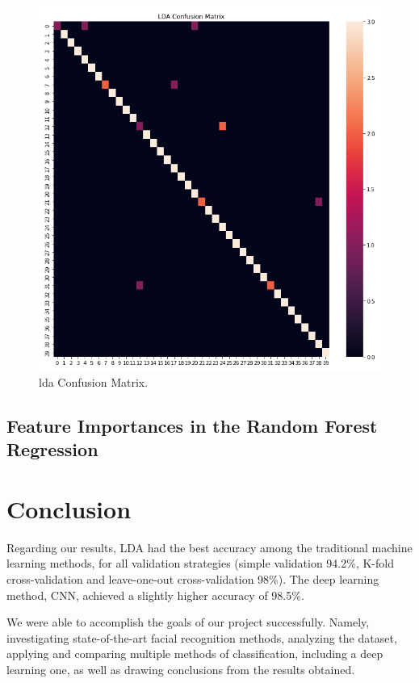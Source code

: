 \documentclass[conference]{IEEEtran}
\begin{document}
\begin{figure}[]
    \centering
    \includegraphics[scale=0.5]{images/8_lda_confusion_matrix.png}
    \caption{\gls{lda} Confusion Matrix.}
    \label{fig:lda_confusion_matrix}
\end{figure}

\subsection{Feature Importances in the Random Forest Regression}

\section{Conclusion}
Regarding our results, LDA had the best accuracy among the traditional machine learning methods, for all validation strategies (simple validation 94.2\%, K-fold cross-validation and leave-one-out cross-validation 98\%).
The deep learning method, CNN, achieved a slightly higher accuracy of 98.5\%.

We were able to accomplish the goals of our project successfully. Namely, investigating state-of-the-art facial recognition methods, analyzing the dataset, applying and comparing multiple methods of classification, including a deep learning one, as well as drawing conclusions from the results obtained.
\end{document}
